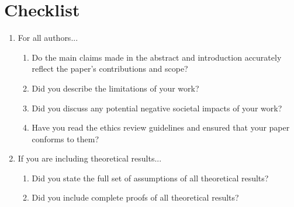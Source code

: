 \documentclass{article}
\begin{document}
\section*{Checklist}

\begin{enumerate}

\item For all authors...
\begin{enumerate}
  \item Do the main claims made in the abstract and introduction accurately reflect the paper's contributions and scope?
  \item Did you describe the limitations of your work?
  \item Did you discuss any potential negative societal impacts of your work?
  \item Have you read the ethics review guidelines and ensured that your paper conforms to them?
    \answerYes{}
\end{enumerate}

\item If you are including theoretical results...
\begin{enumerate}
  \item Did you state the full set of assumptions of all theoretical results?
	\item Did you include complete proofs of all theoretical results?
\end{enumerate}


\end{enumerate}
\end{document}
